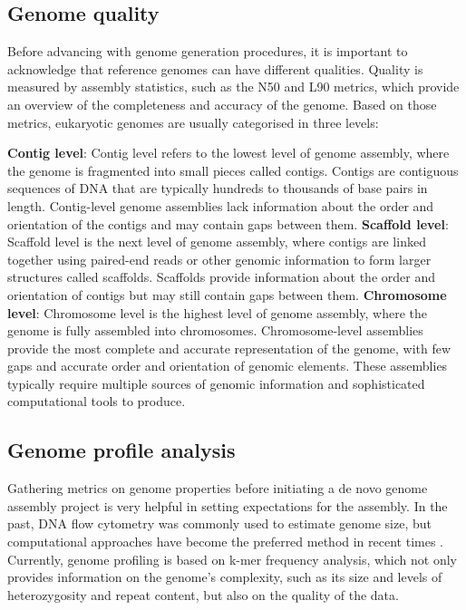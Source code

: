 \documentclass[
]{book}
\begin{document}
\hypertarget{host-genome-quality}{%
\subsection{Genome quality}\label{host-genome-quality}}

Before advancing with genome generation procedures, it is important to acknowledge that reference genomes can have different qualities. Quality is measured by assembly statistics, such as the N50 and L90 metrics, which provide an overview of the completeness and accuracy of the genome. Based on those metrics, eukaryotic genomes are usually categorised in three levels:

\textbf{Contig level}: Contig level refers to the lowest level of genome assembly, where the genome is fragmented into small pieces called contigs. Contigs are contiguous sequences of DNA that are typically hundreds to thousands of base pairs in length. Contig-level genome assemblies lack information about the order and orientation of the contigs and may contain gaps between them.
\textbf{Scaffold level}: Scaffold level is the next level of genome assembly, where contigs are linked together using paired-end reads or other genomic information to form larger structures called scaffolds. Scaffolds provide information about the order and orientation of contigs but may still contain gaps between them.
\textbf{Chromosome level}: Chromosome level is the highest level of genome assembly, where the genome is fully assembled into chromosomes. Chromosome-level assemblies provide the most complete and accurate representation of the genome, with few gaps and accurate order and orientation of genomic elements. These assemblies typically require multiple sources of genomic information and sophisticated computational tools to produce.

\hypertarget{host-genome-profile-analysis}{%
\subsection{Genome profile analysis}\label{host-genome-profile-analysis}}

Gathering metrics on genome properties before initiating a de novo genome assembly project is very helpful in setting expectations for the assembly. In the past, DNA flow cytometry was commonly used to estimate genome size, but computational approaches have become the preferred method in recent times \citep{Wang2020-fj}. Currently, genome profiling is based on k-mer frequency analysis, which not only provides information on the genome's complexity, such as its size and levels of heterozygosity and repeat content, but also on the quality of the data.
\end{document}
